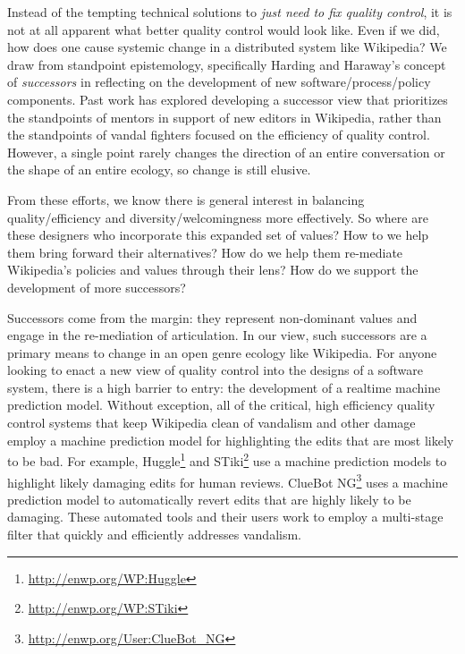 Instead of the tempting technical solutions to \emph{just need to fix quality control}, it is not at all apparent what better quality control would look like.  Even if we did, how does one cause systemic change in a distributed system like Wikipedia?  We draw from standpoint epistemology, specifically Harding and Haraway's concept of \emph{successors}\cite{haraway1988situated}\cite{harding1987feminism} in reflecting on the development of new software/process/policy components.  Past work has explored developing a successor view that prioritizes the standpoints of mentors in support of new editors in Wikipedia, rather than the standpoints of vandal fighters focused on the efficiency of quality control\cite{halfaker2014snuggle}\cite{geiger2014successor}. However, a single point rarely changes the direction of an entire conversation or the shape of an entire ecology, so change is still elusive.

From these efforts, we know there is general interest in balancing quality/efficiency and diversity/welcomingness more effectively.  So where are these designers who incorporate this expanded set of values?  How to we help them bring forward their alternatives?  How do we help them re-mediate Wikipedia's policies and values through their lens?  How do we support the development of more successors?

Successors come from the margin: they represent non-dominant values and engage in the re-mediation of articulation\cite{mugar2017preserving}.  In our view, such successors are a primary means to change in an open genre ecology like Wikipedia.  For anyone looking to enact a new view of quality control into the designs of a software system, there is a high barrier to entry: the development of a realtime machine prediction model.  Without exception, all of the critical, high efficiency quality control systems that keep Wikipedia clean of vandalism and other damage employ a machine prediction model for highlighting the edits that are most likely to be bad. For example, Huggle\footnote{\url{http://enwp.org/WP:Huggle}} and STiki\footnote{\url{http://enwp.org/WP:STiki}} use a machine prediction models to highlight likely damaging edits for human reviews.  ClueBot NG\footnote{\url{http://enwp.org/User:ClueBot\_NG}} uses a machine prediction model to automatically revert edits that are highly likely to be damaging.  These automated tools and their users work to employ a multi-stage filter that quickly and efficiently addresses vandalism\cite{geiger2013levee}.

